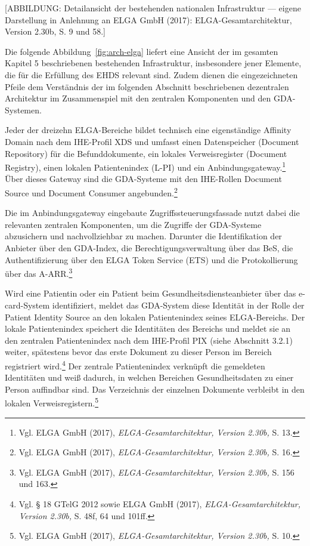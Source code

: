 [ABBILDUNG: Detailansicht der bestehenden nationalen Infrastruktur — eigene Darstellung in Anlehnung an ELGA GmbH (2017): ELGA-Gesamtarchitektur, Version 2.30b, S. 9 und 58.]

Die folgende Abbildung~\ref{fig:arch-elga} liefert eine Ansicht der im gesamten Kapitel 5 beschriebenen bestehenden Infrastruktur, insbesondere jener Elemente, die für die Erfüllung des EHDS relevant sind. Zudem dienen die eingezeichneten Pfeile dem Verständnis der im folgenden Abschnitt beschriebenen dezentralen Architektur im Zusammenspiel mit den zentralen Komponenten und den GDA-Systemen.

Jeder der dreizehn ELGA-Bereiche bildet technisch eine eigenständige Affinity Domain nach dem IHE-Profil XDS und umfasst einen Datenspeicher (Document Repository) für die Befunddokumente, ein lokales Verweisregister (Document Registry), einen lokalen Patientenindex (L-PI) und ein Anbindungsgateway.\footnote{Vgl. ELGA GmbH (2017), \textit{ELGA-Gesamtarchitektur, Version 2.30b,} S. 13.} Über dieses Gateway sind die GDA-Systeme mit den IHE-Rollen Document Source und Document Consumer angebunden.\footnote{Vgl. ELGA GmbH (2017), \textit{ELGA-Gesamtarchitektur, Version 2.30b,} S. 16.}


Die im Anbindungsgateway eingebaute Zugriffssteuerungsfassade nutzt dabei die relevanten zentralen Komponenten, um die Zugriffe der GDA-Systeme abzusichern und nachvollziehbar zu machen. Darunter die Identifikation der Anbieter über den GDA-Index, die Berechtigungsverwaltung über das BeS, die Authentifizierung über den ELGA Token Service (ETS) und die Protokollierung über das A-ARR.\footnote{Vgl. ELGA GmbH (2017), \textit{ELGA-Gesamtarchitektur, Version 2.30b,} S. 156 und 163.}

Wird eine Patientin oder ein Patient beim Gesundheitsdiensteanbieter über das
e-card-System identifiziert, meldet das GDA-System diese Identität in der Rolle
der Patient Identity Source an den lokalen Patientenindex seines ELGA-Bereichs.
Der lokale Patientenindex speichert die Identitäten des Bereichs und meldet
sie an den zentralen Patientenindex nach dem IHE-Profil PIX (siehe Abschnitt 3.2.1) weiter, spätestens bevor das erste Dokument zu dieser Person im Bereich registriert wird.\footnote{Vgl. § 18 GTelG 2012 sowie ELGA GmbH (2017), \textit{ELGA-Gesamtarchitektur, Version 2.30b,} S. 48f, 64 und 101ff.}
Der zentrale Patientenindex verknüpft die gemeldeten Identitäten und weiß
dadurch, in welchen Bereichen Gesundheitsdaten zu einer Person auffindbar sind. Das Verzeichnis der einzelnen Dokumente verbleibt in den lokalen Verweisregistern.\footnote{Vgl. ELGA GmbH (2017), \textit{ELGA-Gesamtarchitektur, Version 2.30b,} S. 10.}

